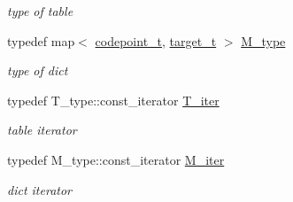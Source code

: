 \begin{DoxyCompactItemize}
\begin{DoxyCompactList}\small\item\em type of table \end{DoxyCompactList}\item 
\hypertarget{namespacejlettvin_a37ff8ef881a4ed6efce44bac38621732}{}typedef map$<$ \hyperlink{namespacejlettvin_a5c480560edc7a71c9f5ae6dad14e6fec}{codepoint\+\_\+t}, \hyperlink{namespacejlettvin_ac925326f2732a65f4e3caaea182401a9}{target\+\_\+t} $>$ \hyperlink{namespacejlettvin_a37ff8ef881a4ed6efce44bac38621732}{M\+\_\+type}\label{namespacejlettvin_a37ff8ef881a4ed6efce44bac38621732}

\begin{DoxyCompactList}\small\item\em type of dict \end{DoxyCompactList}\item 
\hypertarget{namespacejlettvin_a717af5c4fa2045ec8271403a711500be}{}typedef T\+\_\+type\+::const\+\_\+iterator \hyperlink{namespacejlettvin_a717af5c4fa2045ec8271403a711500be}{T\+\_\+iter}\label{namespacejlettvin_a717af5c4fa2045ec8271403a711500be}

\begin{DoxyCompactList}\small\item\em table iterator \end{DoxyCompactList}\item 
\hypertarget{namespacejlettvin_adb899a2c00ed7361dbc22a0bc907f88c}{}typedef M\+\_\+type\+::const\+\_\+iterator \hyperlink{namespacejlettvin_adb899a2c00ed7361dbc22a0bc907f88c}{M\+\_\+iter}\label{namespacejlettvin_adb899a2c00ed7361dbc22a0bc907f88c}

\begin{DoxyCompactList}\small\item\em dict iterator \end{DoxyCompactList}\end{DoxyCompactItemize}
